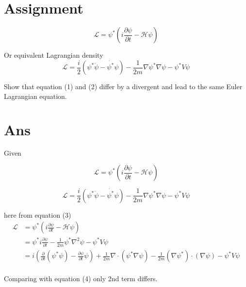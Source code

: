 \documentclass[12pt, letterpaper]{article}
\author{Noor E Mustafa Ferdous}
\title{}
\date{}
\newcommand*{\1}{\hspace{1pt}}
\begin{document}
\section*{Assignment}
    \begin{equation}
        \mathcal{L} = \psi ^{\ast} (i \frac{\partial \psi}{\partial t} - \mathcal{H} \psi) 
    \end{equation}

    Or equivalent Lagrangian density
    \begin{equation}
        \mathcal{L} = \frac{i}{2}(\psi ^{\ast} \dot{\psi} - \dot{\psi ^{\ast}} \psi ) - \frac{1}{2m}\nabla \psi ^{\ast} \nabla \psi - \psi ^{\ast} V \psi
    \end{equation}

    Show that equation (1) and (2) differ by a divergent and lead to the same Euler Lagrangian equation.
\newpage
\section*{Ans}

    Given 
    
    \begin{equation}
        \mathcal{L} = \psi ^{\ast} (i \frac{\partial \psi}{\partial t} - \mathcal{H} \psi) 
    \end{equation}

    \begin{equation}
        \mathcal{L} = \frac{i}{2}(\psi ^{\ast} \dot{\psi} - \dot{\psi ^{\ast}} \psi ) - \frac{1}{2m}\nabla \psi ^{\ast} \nabla \psi - \psi ^{\ast} V \psi
    \end{equation}

    here from equation (3)
    \begin{align*}
        \mathcal{L} & = \psi ^{\ast} (i \frac{\partial \psi}{\partial t} - \mathcal{H} \psi) \\
            & = \psi ^{\ast} i \frac{\partial \psi}{\partial t} - \frac{1}{2m}\psi ^{\ast} \nabla ^{2} \psi - \psi ^{\ast} V \psi \\ 
            & = i (\frac{\partial}{\partial t}(\psi ^{\ast} \psi) - \frac{\partial \psi}{\partial t}\psi) + \frac{1}{2m}\nabla \cdot (\psi ^{\ast} \nabla \psi) -\frac{1}{2m}(\nabla \psi ^{\ast}) \cdot (\nabla \psi)  - \psi^{\ast}V\psi\\ 
    \end{align*}    


    Comparing with equation (4) only 2nd term differs.
\end{document}
